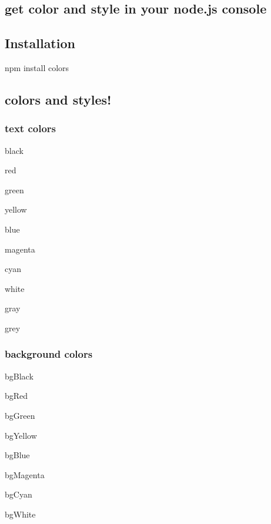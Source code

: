 \subsection*{get color and style in your node.\+js console}



\subsection*{Installation}

\begin{DoxyVerb}npm install colors
\end{DoxyVerb}


\subsection*{colors and styles!}

\subsubsection*{text colors}


\begin{DoxyItemize}
\item black
\item red
\item green
\item yellow
\item blue
\item magenta
\item cyan
\item white
\item gray
\item grey
\end{DoxyItemize}

\subsubsection*{background colors}


\begin{DoxyItemize}
\item bg\+Black
\item bg\+Red
\item bg\+Green
\item bg\+Yellow
\item bg\+Blue
\item bg\+Magenta
\item bg\+Cyan
\item bg\+White
\end{DoxyItemize}

